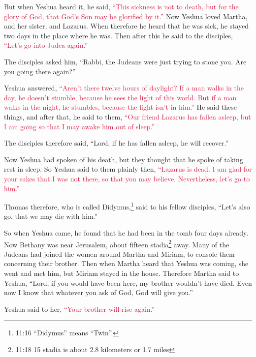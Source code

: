 \myverse{}But when Yeshua heard it, he said,
\textcolor{crimson}{“This sickness is not to death, but for the glory of God, that God’s Son may be glorified by it.”}
\myverse{}Now Yeshua loved Martha, and her sister, and Lazarus.
\myverse{}When therefore he heard that he was sick, he stayed two days in the place where
he was.
\myverse{}Then after this he said to the disciples,
\textcolor{crimson}{“Let’s go into Judea again.”}

\myverse{}The disciples asked him, “Rabbi, the Judeans were just trying
to stone you. Are you going there again?”

\myverse{}Yeshua answered,
\textcolor{crimson}{“Aren’t there twelve hours of daylight? If a man walks in the day, he doesn’t stumble, because he
	sees the light of this world.
}
\myverse{}\textcolor{crimson}{But if a man walks in the night, he stumbles, because the light isn’t
	in him.”}
\myverse{}He said these things, and after that, he said to them,
\textcolor{crimson}{“Our friend Lazarus has fallen asleep, but I am going so that I may awake him out of sleep.”}

\myverse{}The disciples therefore said, “Lord, if he has fallen asleep,
he will recover.”

\myverse{}Now Yeshua had spoken of his death, but they thought that he
spoke of taking rest in sleep.
\myverse{}So Yeshua said to them plainly then,
\textcolor{crimson}{“Lazarus is dead.
}
\myverse{}\textcolor{crimson}{I am glad for your sakes that I was not there, so that you may believe.
	Nevertheless, let’s go to him.”}

\myverse{}Thomas therefore, who is called Didymus,\footnote{11:16 “Didymus” means “Twin”.} said to his fellow disciples, “Let’s also go, that we may die
with him.”

\myverse{}So when Yeshua came, he found that he had been in the tomb four
days already.
\myverse{}Now Bethany was near Jerusalem, about fifteen stadia\footnote{11:18 15 stadia is about 2.8 kilometers or 1.7 miles} away.
\myverse{}Many of the Judeans had joined the women around Martha and Miriam, to console
them concerning their brother.
\myverse{}Then when Martha heard that Yeshua was coming, she went and met him, but
Miriam stayed in the house.
\myverse{}Therefore Martha said to Yeshua, “Lord, if you would have been here, my brother
wouldn’t have died.
\myverse{}Even now I know that whatever you ask of God, God will give you.”

\myverse{}Yeshua said to her,
\textcolor{crimson}{“Your brother will rise again.”}

